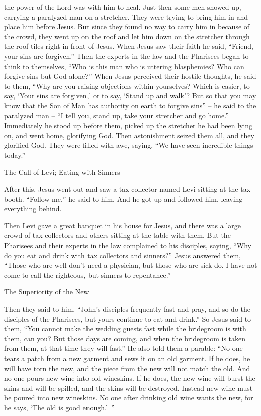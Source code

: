 {the power
of the Lord
was
with him
to
heal.
Just then some men
showed up, carrying
a
paralyzed
man
on
a stretcher.
They were trying
to bring
him
in
and
place
him
before
Jesus.
But
since they found
no
way to carry
him
in
because
of the crowd,
they went up
on
the roof
and let
him
down
on
the stretcher
through
the roof tiles
right in
front
of Jesus.
When
Jesus saw
their
faith
he said,
“Friend,
your
sins
are forgiven.”
Then
the experts in the law
and
the Pharisees
began
to think
to themselves, “Who
is
this man
who
is uttering blasphemies? Who
can
forgive
sins
but
God
alone?”
When
Jesus
perceived
their
hostile thoughts,
he said
to
them, “Why
are you raising objections
within
yourselves?
Which
is
easier,
to say,
‘Your
sins
are forgiven,’
or
to say,
‘Stand up
and
walk’?
But
so
that you may know
that
the Son
of Man
has
authority
on
earth
to forgive
sins”
– he said
to the paralyzed man –
“I tell
you,
stand up,
take
your
stretcher
and go
home.”
Immediately
he stood up
before
them,
picked up
the stretcher he had been lying on,
and went
home,
glorifying
God.
Then
astonishment
seized
them all,
and
they glorified
God.
They were filled
with awe,
saying,
“We have seen
incredible things
today.”
\par }{\SH The Call of Levi; Eating with Sinners
\par }{\PP {}After
this,
Jesus went out
and
saw
a tax collector
named
Levi
sitting
at
the tax booth. “Follow
me,”
he said
to him.
And
he got up
and followed
him,
leaving
everything behind.
\par }{\PP {}Then
Levi
gave
a great
banquet
in
his
house
for Jesus,
and
there was
a
large
crowd
of tax collectors
and
others
sitting at the table
with
them.
But
the Pharisees
and
their
experts in the law
complained
to
his
disciples,
saying,
“Why
do you eat
and
drink
with
tax collectors
and
sinners?”
Jesus
answered
them,
“Those who are well
don’t
need
a physician,
but
those who are sick do.
I have
not
come
to call
the righteous,
but
sinners
to
repentance.”
\par }{\SH The Superiority of the New
\par }{\PP {}Then
they said
to
him,
“John’s
disciples
frequently
fast
and
pray,
and so
do
the disciples of the Pharisees,
but
yours
continue to eat
and
drink.”
So
Jesus
said
to
them,
“You cannot
make the wedding guests
fast
while the bridegroom
is
with
them, can you?
But
those days
are coming,
and
when
the bridegroom
is taken
from
them,
at
that
time
they will fast.”
He
also
told
them
a parable: “No one
tears
a patch
from
a
new
garment
and sews
it on
an old
garment.
If
he does, he will have torn
the new,
and
the piece
from
the new
will not match
the
old.
And
no one
pours
new
wine
into
old
wineskins.
If
he does, the new
wine
will burst
the skins
and
will be spilled,
and
the skins
will be destroyed.
Instead
new
wine
must be poured
into
new
wineskins.
No one
after drinking
old wine
wants
the new,
for
he says,
‘The old
is
good enough.’ ”

}
